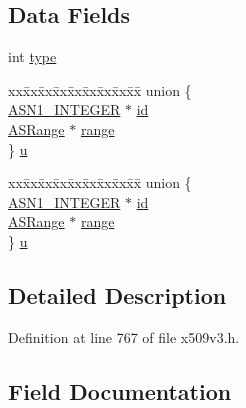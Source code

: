 \subsection*{Data Fields}
\begin{DoxyCompactItemize}
\item 
int \hyperlink{struct_a_s_id_or_range__st_ac765329451135abec74c45e1897abf26}{type}
\item 
\begin{tabbing}
xx\=xx\=xx\=xx\=xx\=xx\=xx\=xx\=xx\=\kill
union \{\\
\>\hyperlink{crypto_2ossl__typ_8h_af4335399bf9774cb410a5e93de65998b}{ASN1\_INTEGER} $\ast$ \hyperlink{struct_a_s_id_or_range__st_a23522c2459cbfd37cfe9b73002bb82b6}{id}\\
\>\hyperlink{crypto_2x509v3_2x509v3_8h_afad916794c1d51aceabe68ae9c784ff6}{ASRange} $\ast$ \hyperlink{struct_a_s_id_or_range__st_ae3380bbb6a888a582fd8f1922c0576f2}{range}\\
\} \hyperlink{struct_a_s_id_or_range__st_aab8fd9fcd0496cafb9ba7da4c73144f0}{u}\\

\end{tabbing}\item 
\begin{tabbing}
xx\=xx\=xx\=xx\=xx\=xx\=xx\=xx\=xx\=\kill
union \{\\
\>\hyperlink{crypto_2ossl__typ_8h_af4335399bf9774cb410a5e93de65998b}{ASN1\_INTEGER} $\ast$ \hyperlink{struct_a_s_id_or_range__st_a23522c2459cbfd37cfe9b73002bb82b6}{id}\\
\>\hyperlink{crypto_2x509v3_2x509v3_8h_afad916794c1d51aceabe68ae9c784ff6}{ASRange} $\ast$ \hyperlink{struct_a_s_id_or_range__st_ae3380bbb6a888a582fd8f1922c0576f2}{range}\\
\} \hyperlink{struct_a_s_id_or_range__st_a0f87daae8639568e823097ee78b6a9dc}{u}\\

\end{tabbing}\end{DoxyCompactItemize}


\subsection{Detailed Description}


Definition at line 767 of file x509v3.\+h.



\subsection{Field Documentation}
